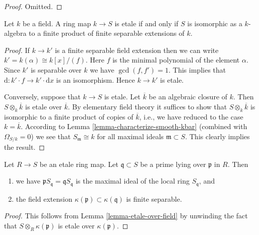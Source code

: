 \begin{proof}
Omitted.
\end{proof}

\begin{lemma}
\label{lemma-etale-over-field}
Let $k$ be a field. A ring map $k \to S$ is etale if and only if $S$
is isomorphic as a $k$-algebra to a finite product of finite separable
extensions of $k$.
\end{lemma}

\begin{proof}
If $k \to k'$ is a finite separable field extension then we can
write $k' = k(\alpha) \cong k[x]/(f)$. Here $f$ is the minimal
polynomial of the element $\alpha$. Since $k'$ is separable over $k$
we have $\gcd(f, f') = 1$. This
implies that $\text{d} : k'\cdot f \to k' \cdot \text{d}x$
is an isomorphism. Hence $k \to k'$ is etale.

\medskip\noindent
Conversely, suppose that $k \to S$ is etale. Let $\overline{k}$
be an algebraic closure of $k$. Then $S \otimes_k \overline{k}$
is etale over $\overline{k}$. By elementary field theory
it suffices to show that $S \otimes_k \overline{k}$ is isomorphic to
a finite product of copies of $\overline{k}$, i.e., we have
reduced to the case $k = \overline{k}$. According to
Lemma \ref{lemma-characterize-smooth-kbar} (combined with
$\Omega_{S/k} = 0$) we see that $S_{\mathfrak m} \cong k$
for all maximal ideals $\mathfrak m \subset S$. This clearly
implies the result.
\end{proof}

\begin{lemma}
\label{lemma-etale-at-prime}
Let $R \to S$ be an etale ring map.
Let $\mathfrak q \subset S$ be a prime lying over $\mathfrak p$ in $R$.
Then 
\begin{enumerate}
\item we have $\mathfrak p S_{\mathfrak q} = \mathfrak qS_{\mathfrak q}$
is the maximal ideal of the local ring $S_{\mathfrak q}$, and
\item the field extension $\kappa(\mathfrak p) \subset \kappa(\mathfrak q)$
is finite separable.
\end{enumerate}
\end{lemma}

\begin{proof}
This follows from Lemma \ref{lemma-etale-over-field} by unwinding the
fact that $S \otimes_R \kappa(\mathfrak p)$ is etale over
$\kappa(\mathfrak p)$.
\end{proof}

